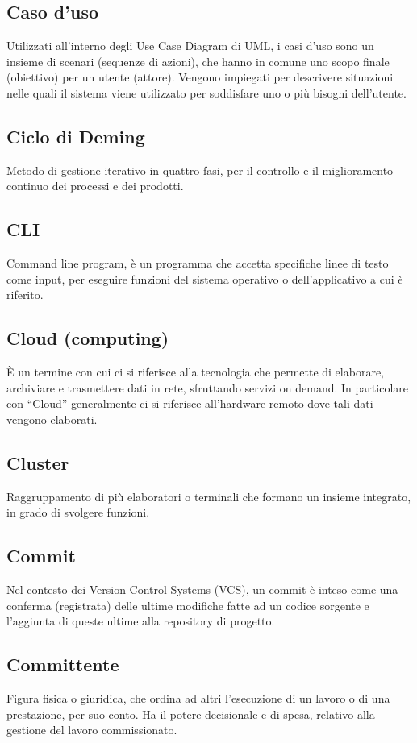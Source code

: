 	\subsection*{Caso d'uso}
	Utilizzati all’interno degli Use Case Diagram di UML, i casi d’uso sono un insieme di scenari (sequenze di azioni), che hanno in comune uno scopo finale (obiettivo) per un utente (attore). Vengono impiegati per descrivere situazioni nelle quali il sistema viene utilizzato per soddisfare uno o più bisogni dell’utente.
	\subsection*{Ciclo di Deming}
	Metodo di gestione iterativo in quattro fasi, per il controllo e il miglioramento continuo dei processi e dei prodotti.
	\subsection*{CLI}
	Command line program, è un programma che accetta specifiche linee di testo come input, per eseguire funzioni del sistema operativo o dell’applicativo a cui è riferito.
	\subsection*{Cloud (computing)}
	È un termine con cui ci si riferisce alla tecnologia che permette di elaborare, archiviare e trasmettere dati in rete, sfruttando servizi on demand. In particolare con “Cloud” generalmente ci si riferisce all’hardware remoto dove tali dati vengono elaborati.
	\subsection*{Cluster}
	Raggruppamento di più elaboratori o terminali che formano un insieme integrato, in grado di svolgere funzioni.
	\subsection*{Commit}
	Nel contesto dei Version Control Systems (VCS), un commit è inteso come una conferma (registrata) delle ultime modifiche fatte ad un codice sorgente e l’aggiunta di queste ultime alla repository di progetto.
	\subsection*{Committente}
	Figura fisica o giuridica, che ordina ad altri l’esecuzione di un lavoro o di una prestazione, per suo conto. Ha il potere decisionale e di spesa, relativo alla gestione del lavoro commissionato.
